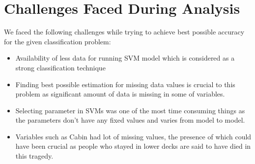 \section{Challenges Faced During Analysis}
\vspace{-0.1in}

We faced the following challenges while trying to achieve best possible accuracy for the given classification problem:

\begin{itemize}
\item Availability of less data for running SVM model which is considered as a strong classification technique
\item Finding best possible estimation for missing data values is crucial to this problem as significant amount of data is missing in some of variables.
\item Selecting parameter in SVMs was one of the most time consuming things as the parameters don't have any fixed values and varies from model to model.
\item Variables such as Cabin had lot of missing values, the presence of which could have been crucial as people who stayed in lower decks are said to have died in this tragedy.
\end{itemize}